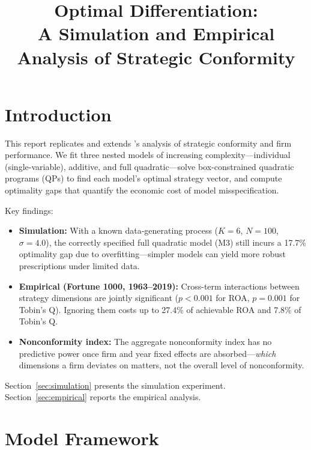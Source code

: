 \documentclass[12pt]{article}
\title{Optimal Differentiation: \\
A Simulation and Empirical Analysis of Strategic Conformity}
\author{}
\date{}
\begin{document}
\maketitle

\tableofcontents
\clearpage

\section{Introduction}
\label{sec:introduction}

This report replicates and extends \citet{miller2013}'s analysis of strategic conformity and firm performance. We fit three nested models of increasing complexity---individual (single-variable), additive, and full quadratic---solve box-constrained quadratic programs (QPs) to find each model's optimal strategy vector, and compute optimality gaps that quantify the economic cost of model misspecification.

Key findings:
\begin{itemize}
    \item \textbf{Simulation:} With a known data-generating process ($K=6$, $N=100$, $\sigma=4.0$), the correctly specified full quadratic model (M3) still incurs a 17.7\% optimality gap due to overfitting---simpler models can yield more robust prescriptions under limited data.
    \item \textbf{Empirical (Fortune 1000, 1963--2019):} Cross-term interactions between strategy dimensions are jointly significant ($p < 0.001$ for ROA, $p = 0.001$ for Tobin's Q). Ignoring them costs up to 27.4\% of achievable ROA and 7.8\% of Tobin's Q.
    \item \textbf{Nonconformity index:} The aggregate nonconformity index \citep{miller2013} has no predictive power once firm and year fixed effects are absorbed---\emph{which} dimensions a firm deviates on matters, not the overall level of nonconformity.
\end{itemize}

Section~\ref{sec:simulation} presents the simulation experiment. Section~\ref{sec:empirical} reports the empirical analysis.

\section{Model Framework}
\label{sec:models}
\end{document}
